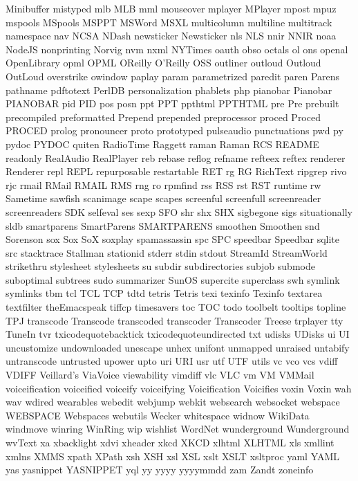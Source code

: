 Minibuffer
mistyped
mlb
MLB
mml
mouseover
mplayer
MPlayer
mpost
mpuz
mspools
MSpools
MSPPT
MSWord
MSXL
multicolumn
multiline
multitrack
namespace
nav
NCSA
NDash
newsticker
Newsticker
nls
NLS
nnir
NNIR
noaa
NodeJS
nonprinting
Norvig
nvm
nxml
NYTimes
oauth
obso
octals
ol
ons
openal
OpenLibrary
opml
OPML
OReilly
O'Reilly
OSS
outliner
outloud
Outloud
OutLoud
overstrike
owindow
paplay
param
parametrized
paredit
paren
Parens
pathname
pdftotext
PerlDB
personalization
phablets
php
pianobar
Pianobar
PIANOBAR
pid
PID
pos
posn
ppt
PPT
ppthtml
PPTHTML
pre
Pre
prebuilt
precompiled
preformatted
Prepend
prepended
preprocessor
proced
Proced
PROCED
prolog
pronouncer
proto
prototyped
pulseaudio
punctuations
pwd
py
pydoc
PYDOC
quiten
RadioTime
Raggett
raman
Raman
RCS
README
readonly
RealAudio
RealPlayer
reb
rebase
reflog
refname
refteex
reftex
renderer
Renderer
repl
REPL
repurposable
restartable
RET
rg
RG
RichText
ripgrep
rivo
rjc
rmail
RMail
RMAIL
RMS
rng
ro
rpmfind
rss
RSS
rst
RST
runtime
rw
Sametime
sawfish
scanimage
scape
scapes
screenful
screenfull
screenreader
screenreaders
SDK
selfeval
ses
sexp
SFO
shr
shx
SHX
sigbegone
sigs
situationally
sldb
smartparens
SmartParens
SMARTPARENS
smoothen
Smoothen
snd
Sorenson
sox
Sox
SoX
soxplay
spamassassin
spc
SPC
speedbar
Speedbar
sqlite
src
stacktrace
Stallman
stationid
stderr
stdin
stdout
StreamId
StreamWorld
strikethru
stylesheet
stylesheets
su
subdir
subdirectories
subjob
submode
suboptimal
subtrees
sudo
summarizer
SunOS
supercite
superclass
swh
symlink
symlinks
tbm
tcl
TCL
TCP
tdtd
tetris
Tetris
texi
texinfo
Texinfo
textarea
textfilter
theEmacspeak
tiffcp
timesavers
toc
TOC
todo
toolbelt
tooltips
topline
TPJ
transcode
Transcode
transcoded
transcoder
Transcoder
Treese
trplayer
tty
TuneIn
tvr
txicodequotebacktick
txicodequoteundirected
txt
udisks
UDisks
ui
UI
uncustomize
undownloaded
unescape
unhex
unifont
unmapped
unraised
untabify
untranscode
untrusted
upower
upto
uri
URI
usr
utf
UTF
utils
vc
vco
vcs
vdiff
VDIFF
Veillard's
ViaVoice
viewability
vimdiff
vlc
VLC
vm
VM
VMMail
voiceification
voiceified
voiceify
voiceifying
Voicification
Voicifies
voxin
Voxin
wah
wav
wdired
wearables
webedit
webjump
webkit
websearch
websocket
webspace
WEBSPACE
Webspaces
webutils
Wecker
whitespace
widnow
WikiData
windmove
winring
WinRing
wip
wishlist
WordNet
wunderground
Wunderground
wvText
xa
xbacklight
xdvi
xheader
xkcd
XKCD
xlhtml
XLHTML
xls
xmllint
xmlns
XMMS
xpath
XPath
xsh
XSH
xsl
XSL
xslt
XSLT
xsltproc
yaml
YAML
yas
yasnippet
YASNIPPET
yql
yy
yyyy
yyyymmdd
zam
Zandt
zoneinfo

